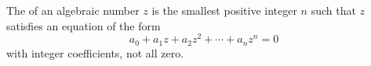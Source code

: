 The  of an algebraic number $z$ is the smallest positive integer $n$ such that $z$ satisfies an equation of the form
$$a_0 + a_1 z + a_2 z^2 + \cdots + a_n z^n = 0$$
with integer coefficients, not all zero.
